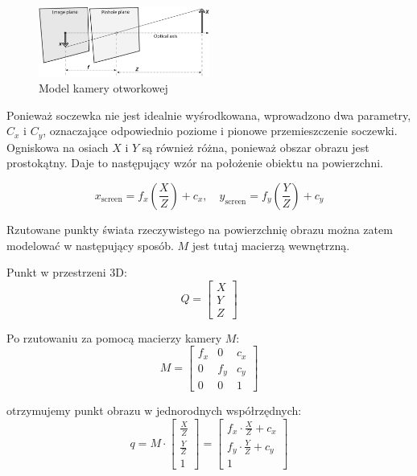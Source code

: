 \documentclass[magisterska]{pracadypl}
\begin{document}
\begin{figure}[H]  %
    \centering  %
    \includegraphics[width=0.5\textwidth]{images/pinhole.png}  %
    \captionsetup{font=footnotesize}
    \caption[Model kamery otworkowej. Learning OpenCV 3, O'Reilly, Str. 639]{Model kamery otworkowej}
    \label{fig:rpi}  %
\end{figure}

Ponieważ soczewka nie jest idealnie wyśrodkowana, wprowadzono dwa parametry, $C_x$ i $C_y$, oznaczające odpowiednio poziome i pionowe przemieszczenie soczewki.
Ogniskowa na osiach $X$ i $Y$ są również różna, ponieważ obszar obrazu jest prostokątny. Daje to następujący wzór na położenie obiektu na powierzchni.

\[
x_{\text{screen}} = f_x \left( \frac{X}{Z} \right) + c_x, \quad
y_{\text{screen}} = f_y \left( \frac{Y}{Z} \right) + c_y
\]

Rzutowane punkty świata rzeczywistego na powierzchnię obrazu można zatem modelować w następujący sposób. $M$ jest tutaj macierzą wewnętrzną.

\bigskip

Punkt w przestrzeni 3D:
\[
Q = \begin{bmatrix} X \\ Y \\ Z \end{bmatrix}
\]

Po rzutowaniu za pomocą macierzy kamery $M$:
\[
M = \begin{bmatrix}
f_x & 0 & c_x \\
0 & f_y & c_y \\
0 & 0 & 1
\end{bmatrix}
\]

otrzymujemy punkt obrazu w jednorodnych współrzędnych:
\[
q = M \cdot \begin{bmatrix}
\frac{X}{Z} \\
\frac{Y}{Z} \\
1
\end{bmatrix}
=
\begin{bmatrix}
f_x \cdot \frac{X}{Z} + c_x \\
f_y \cdot \frac{Y}{Z} + c_y \\
1
\end{bmatrix}
\]
\end{document}
